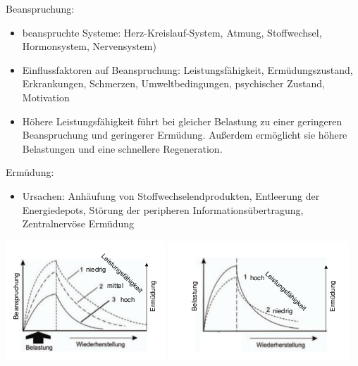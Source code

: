 \begin{minipage}{0.6\textwidth}
Beanspruchung:
\begin{itemize}
    \item beanspruchte Systeme: Herz-Kreislauf-System, Atmung, Stoffwechsel, Hormonsystem, Nervensystem)
    \item Einflussfaktoren auf Beanspruchung: Leistungsfähigkeit, Ermüdungszustand, Erkrankungen, Schmerzen, Umweltbedingungen, psychischer Zustand, Motivation
    \item Höhere Leistungsfähigkeit führt bei gleicher Belastung zu einer geringeren Beanspruchung und geringerer Ermüdung. Außerdem ermöglicht sie höhere Belastungen und eine schnellere Regeneration.
\end{itemize}
Ermüdung:
\begin{itemize}
    \item Ursachen: Anhäufung von Stoffwechselendprodukten, Entleerung der Energiedepots, Störung der peripheren Informationsübertragung, Zentralnervöse Ermüdung
\end{itemize}
\end{minipage}
\begin{minipage}{0.4\textwidth}
\includegraphics[width=\textwidth]{pictures/bs1}
\includegraphics[width=\textwidth]{pictures/bs2}
\end{minipage}

